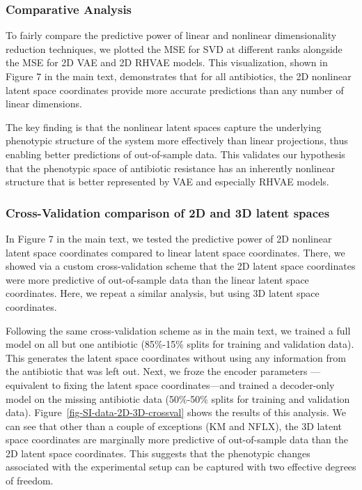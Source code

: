 \documentclass[
]{scrartcl}
\begin{document}
\begin{refsection}
\subsubsection{Comparative Analysis}\label{comparative-analysis}

To fairly compare the predictive power of linear and nonlinear
dimensionality reduction techniques, we plotted the MSE for SVD at
different ranks alongside the MSE for 2D VAE and 2D RHVAE models. This
visualization, shown in Figure 7 in the main text, demonstrates that for
all antibiotics, the 2D nonlinear latent space coordinates provide more
accurate predictions than any number of linear dimensions.

The key finding is that the nonlinear latent spaces capture the
underlying phenotypic structure of the system more effectively than
linear projections, thus enabling better predictions of out-of-sample
data. This validates our hypothesis that the phenotypic space of
antibiotic resistance has an inherently nonlinear structure that is
better represented by VAE and especially RHVAE models.

\subsubsection{Cross-Validation comparison of 2D and 3D latent
spaces}\label{cross-validation-comparison-of-2d-and-3d-latent-spaces}

In Figure 7 in the main text, we tested the predictive power of 2D
nonlinear latent space coordinates compared to linear latent space
coordinates. There, we showed via a custom cross-validation scheme that
the 2D latent space coordinates were more predictive of out-of-sample
data than the linear latent space coordinates. Here, we repeat a similar
analysis, but using 3D latent space coordinates.

Following the same cross-validation scheme as in the main text, we
trained a full model on all but one antibiotic (85\%-15\% splits for
training and validation data). This generates the latent space
coordinates without using any information from the antibiotic that was
left out. Next, we froze the encoder parameters ---equivalent to fixing
the latent space coordinates---and trained a decoder-only model on the
missing antibiotic data (50\%-50\% splits for training and validation
data). Figure~\ref{fig-SI-data-2D-3D-crossval} shows the results of this
analysis. We can see that other than a couple of exceptions (KM and
NFLX), the 3D latent space coordinates are marginally more predictive of
out-of-sample data than the 2D latent space coordinates. This suggests
that the phenotypic changes associated with the experimental setup can
be captured with two effective degrees of freedom.


\end{refsection}
\end{document}
